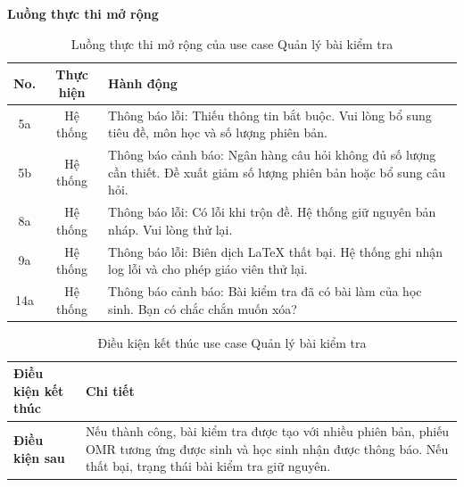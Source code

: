 ﻿\documentclass[../DoAn.tex]{subfiles}
\begin{document}
\noindent\textbf{Luồng thực thi mở rộng}
\begin{table}[H]
\centering
\begin{tabular}{|c|c|p{9cm}|}
\hline
\textbf{No.} & \textbf{Thực hiện} & \textbf{Hành động} \\ \hline
5a & Hệ thống & Thông báo lỗi: Thiếu thông tin bắt buộc. Vui lòng bổ sung tiêu đề, môn học và số lượng phiên bản. \\ \hline
5b & Hệ thống & Thông báo cảnh báo: Ngân hàng câu hỏi không đủ số lượng cần thiết. Đề xuất giảm số lượng phiên bản hoặc bổ sung câu hỏi. \\ \hline
8a & Hệ thống & Thông báo lỗi: Có lỗi khi trộn đề. Hệ thống giữ nguyên bản nháp. Vui lòng thử lại. \\ \hline
9a & Hệ thống & Thông báo lỗi: Biên dịch LaTeX thất bại. Hệ thống ghi nhận log lỗi và cho phép giáo viên thử lại. \\ \hline
14a & Hệ thống & Thông báo cảnh báo: Bài kiểm tra đã có bài làm của học sinh. Bạn có chắc chắn muốn xóa? \\ \hline
\end{tabular}
\caption{Luồng thực thi mở rộng của use case Quản lý bài kiểm tra}
\label{table:2.3.3_ext}
\end{table}
\begin{table}[H]
\centering
\begin{tabular}{|p{4cm}|p{10cm}|}
\hline
\textbf{Điều kiện kết thúc} & \textbf{Chi tiết} \\ \hline
\textbf{Điều kiện sau} & Nếu thành công, bài kiểm tra được tạo với nhiều phiên bản, phiếu OMR tương ứng được sinh và học sinh nhận được thông báo. Nếu thất bại, trạng thái bài kiểm tra giữ nguyên. \\ \hline
\end{tabular}
\caption{Điều kiện kết thúc use case Quản lý bài kiểm tra}
\label{table:2.3.3_post}
\end{table}
\end{document}
